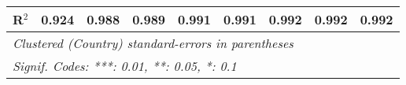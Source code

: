 \begin{table}[htbp]
\begin{tabular}{lcccccccc}
      R$^2$                                                                   & 0.924   & 0.988   & 0.989         & 0.991          & 0.991          & 0.992          & 0.992          & 0.992\\  
      \midrule
      \multicolumn{9}{l}{\emph{Clustered (Country) standard-errors in parentheses}}\\
      \multicolumn{9}{l}{\emph{Signif. Codes: ***: 0.01, **: 0.05, *: 0.1}}\\
   \end{tabular}
\end{table}


